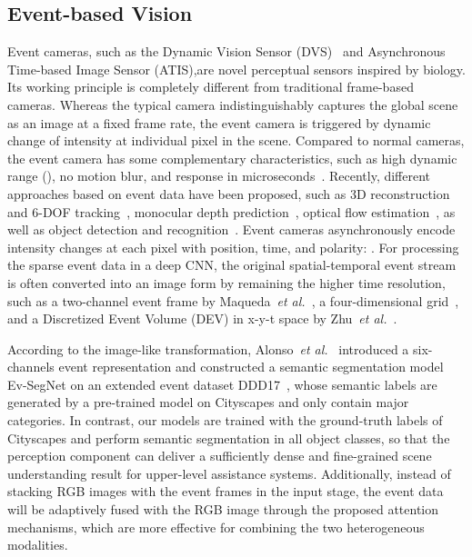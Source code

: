 \documentclass[journal]{IEEEtran}
\begin{document}
\subsection{Event-based Vision}
Event cameras, such as the Dynamic Vision Sensor (DVS)~\cite{patrick2008DVS_sensor} and Asynchronous Time-based Image Sensor (ATIS),are novel perceptual sensors inspired by biology. Its working principle is completely different from traditional frame-based cameras. Whereas the typical camera indistinguishably captures the global scene as an image at a fixed frame rate, the event camera is triggered by dynamic change of intensity at individual pixel in the scene. Compared to normal cameras, the event camera has some complementary characteristics, such as high dynamic range (), no motion blur, and response in microseconds~\cite{gallego2019event_survey}. Recently, different approaches based on event data have been proposed, such as 3D reconstruction and 6-DOF tracking~\cite{kim2016_3drecon_event}, monocular depth prediction~\cite{gehrig2021combining}, optical flow estimation~\cite{zhu2018ev-flownet}, as well as object detection and recognition~\cite{mitrokhin2018objdetect_event}. Event cameras asynchronously encode intensity changes at each pixel with position, time, and polarity: . For processing the sparse event data in a deep CNN, the original spatial-temporal event stream is often converted into an image form by remaining the higher time resolution, such as a two-channel event frame by Maqueda~\textit{et al.}~\cite{maqueda2018eventframe_2channel}, a four-dimensional grid~\cite{zhu2018ev-flownet}, and a Discretized Event Volume (DEV) in x-y-t space by Zhu~\textit{et al.}~\cite{zhu2019unsupervised}.

According to the image-like transformation, Alonso~\textit{et al.}~\cite{alonso2019Ev-SegNet} introduced a six-channels event representation and constructed a semantic segmentation model Ev-SegNet on an extended event dataset DDD17~\cite{binas2017ddd17}, whose semantic labels are generated by a pre-trained model on Cityscapes and only contain  major categories. In contrast, our models are trained with the ground-truth labels of Cityscapes and perform semantic segmentation in all  object classes, so that the perception component can deliver a sufficiently dense and fine-grained scene understanding result for upper-level assistance systems. Additionally, instead of stacking RGB images with the event frames in the input stage, the event data will be adaptively fused with the RGB image through the proposed attention mechanisms, which are more effective for combining the two heterogeneous modalities.
\end{document}
